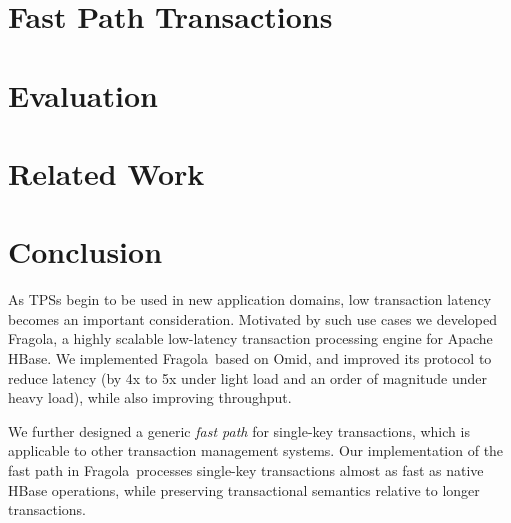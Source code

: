 \documentclass[letterpaper,twocolumn,10pt]{article}
\newcommand{\sys}{Fragola}
\begin{document}
\section{Fast Path Transactions}
\label{sec:alg}


\section{Evaluation} \label{sec:eval}


\section{Related Work} \label{sec:related}


\section{Conclusion} \label{sec:conclusions}

As TPSs begin to be used in new application domains, low transaction 
latency becomes an important consideration. 
Motivated by such use cases we developed \sys, a highly scalable 
low-latency transaction processing engine for Apache HBase. 
We implemented \sys\ based on Omid, and 
improved its protocol to reduce latency (by 4x to 5x under light load
and an order of magnitude under heavy load), 
while also improving throughput. 

We further designed a generic \emph{fast path} for single-key transactions,
which is applicable to other transaction management systems.
Our implementation of the fast path in \sys\ processes single-key
transactions almost as fast as native HBase operations, while preserving
transactional semantics relative to longer transactions.


\newpage



\end{document}
